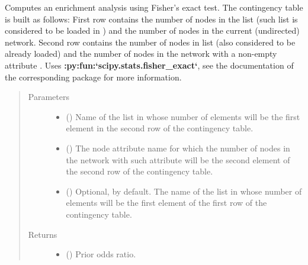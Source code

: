 \documentclass[letterpaper,10pt,english]{sphinxmanual}
\begin{document}
\begin{fulllineitems}
\begin{fulllineitems}
\label{\detokenize{main:pypath.main.PyPath.fisher_enrichment}}
Computes an enrichment analysis using Fisher’s exact test. The
contingency table is built as follows:
First row contains the number of nodes in the  list (such
list is considered to be loaded in
) and the number of nodes in
the current (undirected) network. Second row contains the number
of nodes in  list (also considered to be already loaded)
and the number of nodes in the network with a non-empty
attribute . Uses {\color{red}\bfseries{}:py:fun:{}`scipy.stats.fisher\_exact{}`}, see
the documentation of the corresponding package for more
information.
\begin{quote}\begin{description}
\item[{Parameters}] \leavevmode\begin{itemize}
\item {} 
 () \textendash{} Name of the list in 
whose number of elements will be the first element in the
second row of the contingency table.

\item {} 
 () \textendash{} The node attribute name for which the number of nodes in the
network with such attribute will be the second element of
the second row of the contingency table.

\item {} 
 () \textendash{} Optional,  by default. The name of the list in
 whose number of elements
will be the first element of the first row of the
contingency table.

\end{itemize}

\item[{Returns}] \leavevmode
\begin{itemize}
\item {} 
() \textendash{} Prior odds ratio.


\end{itemize}
\end{description}
\end{quote}
\end{fulllineitems}
\end{fulllineitems}
\end{document}
